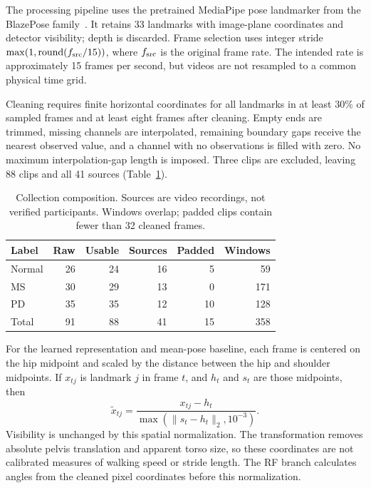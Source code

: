 \documentclass[10pt,twocolumn,letterpaper]{article}
\begin{document}
The processing pipeline uses the pretrained MediaPipe pose landmarker from the BlazePose family~\cite{blazepose}. It retains 33 landmarks with image-plane coordinates and detector visibility; depth is discarded. Frame selection uses integer stride $\max(1,\operatorname{round}(f_{\rm src}/15))$, where $f_{\rm src}$ is the original frame rate. The intended rate is approximately 15 frames per second, but videos are not resampled to a common physical time grid.

Cleaning requires finite horizontal coordinates for all landmarks in at least 30\% of sampled frames and at least eight frames after cleaning. Empty ends are trimmed, missing channels are interpolated, remaining boundary gaps receive the nearest observed value, and a channel with no observations is filled with zero. No maximum interpolation-gap length is imposed. Three clips are excluded, leaving 88 clips and all 41 sources (Table~\ref{tab:data}).

\begin{table}[t]
\centering
\caption{Collection composition. Sources are video recordings, not verified participants. Windows overlap; padded clips contain fewer than 32 cleaned frames.}
\label{tab:data}
\small\setlength{\tabcolsep}{4pt}
\begin{tabular}{lrrrrr}
\toprule
Label & Raw & Usable & Sources & Padded & Windows\\
\midrule
Normal &26&24&16&5&59\\
MS &30&29&13&0&171\\
PD &35&35&12&10&128\\
\midrule
Total &91&88&41&15&358\\
\bottomrule
\end{tabular}
\end{table}

For the learned representation and mean-pose baseline, each frame is centered on the hip midpoint and scaled by the distance between the hip and shoulder midpoints. If $x_{tj}$ is landmark $j$ in frame $t$, and $h_t$ and $s_t$ are those midpoints, then
\begin{equation}
\widetilde{x}_{tj}=\frac{x_{tj}-h_t}{\max(\|s_t-h_t\|_2,10^{-3})}.
\end{equation}
Visibility is unchanged by this spatial normalization. The transformation removes absolute pelvis translation and apparent torso size, so these coordinates are not calibrated measures of walking speed or stride length. The RF branch calculates angles from the cleaned pixel coordinates before this normalization.
\end{document}
